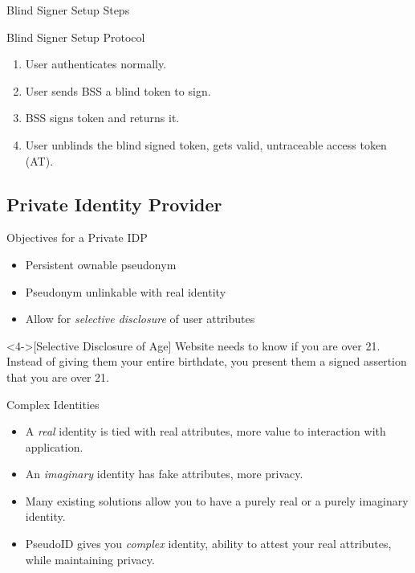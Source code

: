 \documentclass[handout]{beamer}
\begin{document}
\begin{frame}{Blind Signer Setup Steps}
  \begin{alertblock}{Blind Signer Setup Protocol}
    \begin{enumerate}
      \item<1-> User authenticates normally.
      \item<2-> User sends BSS a blind token to sign.
      \item<3-> BSS signs token and returns it.
      \item<4-> User unblinds the blind signed token, gets valid, untraceable
access token (AT).
    \end{enumerate}
  \end{alertblock}
\end{frame}

\subsection{Private Identity Provider}

\begin{frame}{Objectives for a Private IDP}
  \begin{itemize}
    \item<1-> Persistent ownable pseudonym
    \item<2-> Pseudonym unlinkable with real identity
    \item<3-> Allow for \emph{selective disclosure} of user attributes
  \end{itemize}

  \begin{example}<4->[Selective Disclosure of Age]
    Website needs to know if you are over 21. Instead of giving them your entire
    birthdate, you present them a signed assertion that you are over 21.
  \end{example}
\end{frame}

\begin{frame}{Complex Identities}
  \begin{itemize}
    \item<1-> A \emph{real} identity is tied with real attributes, more value to
    interaction with application.
    \item<2-> An \emph{imaginary} identity has fake attributes, more privacy.
    \item<3-> Many existing solutions allow you to have a purely real or a
    purely imaginary identity.
    \item<4-> PseudoID gives you \emph{complex} identity, ability to attest your
    real attributes, while maintaining privacy.
  \end{itemize}
\end{frame}
\end{document}
